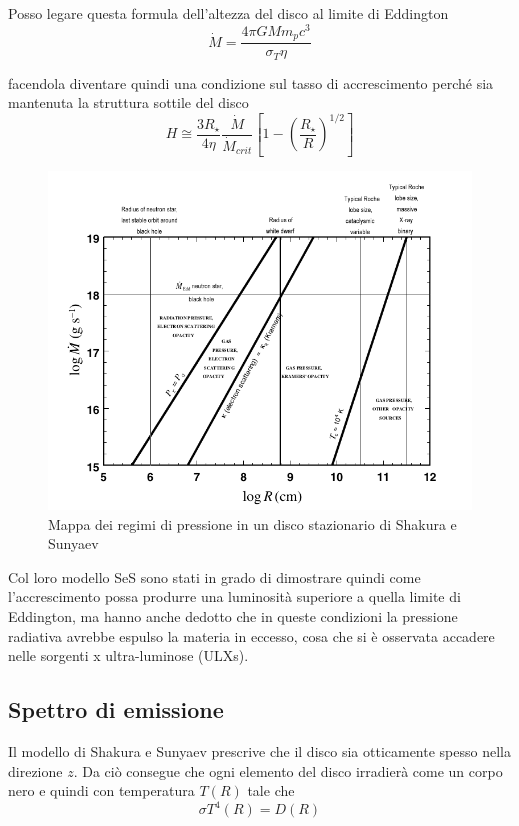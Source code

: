 \documentclass[a4paperbi]{article}
\begin{document}
	Posso legare questa formula dell'altezza del disco al limite di Eddington
	\begin{equation*}
		\dot{M}=\frac{4\pi GMm_pc^3}{\sigma_T \eta}
	\end{equation*}
	
	facendola diventare quindi una condizione sul tasso di accrescimento perché sia mantenuta la struttura sottile del disco
	\begin{equation}
		H\cong\frac{3R_{\star}}{4\eta}\frac{\dot{M}}{\dot{M}_{crit}}\left[1-\left(\frac{R_{\star}}{R}\right)^{1/2}\right]
	\end{equation}
	
	\begin{figure}[H]
		\centering
		\includegraphics[width=1\linewidth]{MappaPressione}
		\caption{Mappa dei regimi di pressione in un disco stazionario di Shakura e Sunyaev}
		\label{fig:MappaPressione}
	\end{figure}
	
	Col loro modello SeS sono stati in grado di dimostrare quindi come l'accrescimento possa produrre una luminosità superiore a quella limite di Eddington, ma hanno anche dedotto che in queste condizioni la pressione radiativa avrebbe espulso la materia in eccesso, cosa che si è osservata accadere  nelle sorgenti x ultra-luminose (ULXs).
	
\subsection{Spettro di emissione}
	Il modello di Shakura e Sunyaev prescrive che il disco sia otticamente spesso nella direzione $z$. Da ciò consegue che ogni elemento del disco irradierà come un corpo nero e quindi con temperatura $T(R)$ tale che
	\begin{equation}
		\sigma T^4(R)=D(R)
	\end{equation}
	
\end{document}
